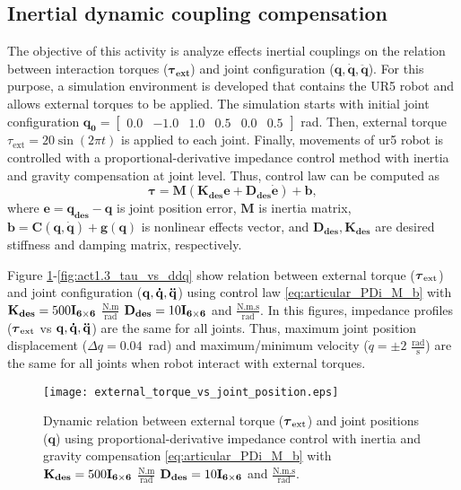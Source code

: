 \graphicspath{{images/act_1.3/}}
\subsection{Inertial dynamic coupling compensation}
The objective of this activity is analyze effects inertial couplings on the relation between interaction torques ($\boldsymbol{\tau}_\mathbf{ext}$) and joint configuration ($\mathbf{q, \dot{q}, \ddot{q}}$). For this purpose, a simulation environment is developed that contains the UR5 robot and allows external torques to be applied. The simulation starts with initial joint configuration $\mathbf{q_0}=\begin{bmatrix} 0.0 & -1.0 & 1.0 & 0.5 & 0.0 & 0.5 \end{bmatrix}$ rad. Then, external torque $\tau_\mathrm{ext}= 20\sin{(2\pi t)}$ is applied to each joint. Finally, movements of ur5 robot is controlled with a proportional-derivative impedance control method with inertia and gravity compensation at joint level. Thus, control law can be computed as 
\begin{equation}
	\boldsymbol{\tau}
	= \mathbf{M}\left(\mathbf{K_{des} e} + \mathbf{D_{des} \dot{e}}\right) + \mathbf{b},
	\label{eq:articular_PDi_M_b}
\end{equation}
\noindent where $\mathbf{e}=\mathbf{q_{des} - q}$ is joint position error, $\mathbf{M}$ is inertia matrix, $\mathbf{b}=\mathbf{C(q, \dot{q})} + \mathbf{g(q)}$ is nonlinear effects vector, and $\mathbf{D_{des}, K_{des}}$ are desired stiffness and damping matrix, respectively.

Figure \ref{fig:act1.3_tau_vs_q}-\ref{fig:act1.3_tau_vs_ddq} show relation between external torque ($\boldsymbol{\tau}_\mathrm{ext}$) and joint configuration ($\mathbf{q, \dot{q}, \ddot{q}}$) using control law \eqref{eq:articular_PDi_M_b} with $\mathbf{K_{des}}=500\mathbf{I_{6 \times 6}}$ $\mathrm{\frac{N.m}{rad}}$ $\mathbf{D_{des}}=10\mathbf{I_{6 \times 6}}$ and $\mathrm{\frac{N.m.s}{rad}}$. In this figures, impedance profiles ($\boldsymbol{\tau}_\mathrm{ext}$ vs $\mathbf{q, \dot{q}, \ddot{q}}$) are the same for all joints. Thus, maximum joint position displacement ($\Delta q=0.04$~rad) and maximum/minimum velocity ($\dot{q}= \pm 2$ $\mathrm{\frac{rad}{s}}$) are the same for all joints when robot interact with external torques.

\begin{figure}
\centering
\texttt{[image: external\_torque\_vs\_joint\_position.eps]}
\caption{Dynamic relation between external torque ($\boldsymbol{\tau}_\mathrm{ext}$) and joint positions ($\mathbf{q}$) using proportional-derivative impedance control with inertia and gravity compensation \eqref{eq:articular_PDi_M_b} with $\mathbf{K_{des}}=500\mathbf{I_{6 \times 6}}$ $\mathrm{\frac{N.m}{rad}}$ $\mathbf{D_{des}}=10\mathbf{I_{6 \times 6}}$ and $\mathrm{\frac{N.m.s}{rad}}$.}
\label{fig:act1.3_tau_vs_q}
\end{figure}

